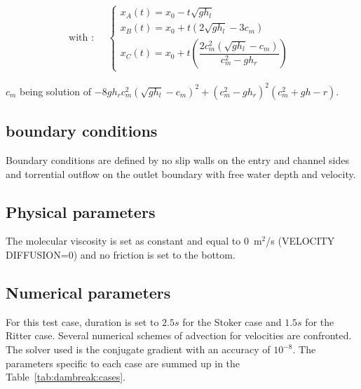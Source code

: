 \begin{equation}
\text{with :} \quad \begin{split}\begin{cases}
x_A(t) = x_0 - t \sqrt{g h_l} \\
x_B(t) = x_0 + t \left( 2 \sqrt{gh_l} - 3c_m \right) \\
x_C(t) = x_0 + t \left( \dfrac{2c_m^2 \left( \sqrt{gh_l} - c_m \right)}{c_m^2-g h_r} \right)
\end{cases}\end{split}
\end{equation}

$c_m$ being solution of $-8g h_r c_m^2 (\sqrt{gh_l}-c_m)^2+(c_m^2-gh_r)^2(c_m^2+gh-r)$.

\subsection{boundary conditions}
Boundary conditions are defined by no slip walls on the entry and channel sides and torrential outflow on the outlet boundary 
with free water depth and velocity.

%
\subsection{Physical parameters}
%
The molecular viscosity is set as constant and equal to 0~m$^2$/s (VELOCITY DIFFUSION=0) and
no friction is set to the bottom.

\subsection{Numerical parameters}

For this test case, duration is set to $2.5s$ for the Stoker case and $1.5s$ for the Ritter case.
Several numerical schemes of advection for velocities are confronted. 
The solver used is the conjugate gradient with an accuracy of $10^{-8}$.
The parameters specific to each case are summed up in the Table~\ref{tab:dambreak:cases}.
\begin{table}[H]
  \caption{List of the simulation parameters used for the six cases tested in the Ritter and Stokes cases.}
  \label{tab:dambreak:cases}
\end{table}
%

